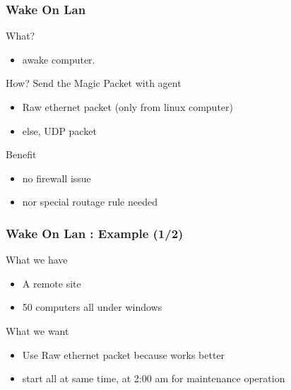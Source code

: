 \documentclass{beamer}
\begin{document}
\begin{frame}
    \frametitle{Wake On Lan}

    \begin{block}{What?}
    \begin{itemize}
        \item awake computer.
    \end{itemize}
    \end{block}

\pause

    \begin{block}{How?}
        Send the Magic Packet with agent
    \begin{itemize}
	\item Raw ethernet packet (only from linux computer)
	\item else, UDP packet
    \end{itemize}
    \end{block}

\pause

    \begin{block}{Benefit}
    \begin{itemize}
        \item no firewall issue
        \item nor special routage rule needed
    \end{itemize}
    \end{block}

\end{frame}

\begin{frame}
    \frametitle{Wake On Lan : Example (1/2)}

    \begin{block}{What we have}
    \begin{itemize}
    \item A remote site
    \item 50 computers all under windows
    \end{itemize}
    \end{block}


    \begin{block}{What we want}
    \begin{itemize}
    \item Use Raw ethernet packet because works better
    \item start all at same time, at 2:00 am for maintenance operation
    \end{itemize}
    \end{block}

\end{frame}
\end{document}
